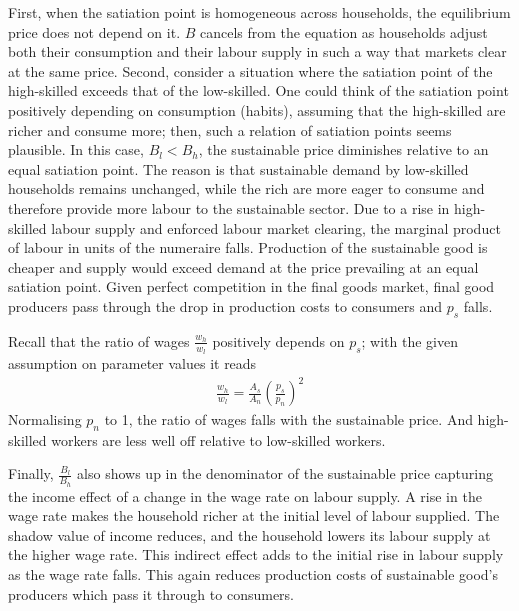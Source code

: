 First, when the satiation point is homogeneous across households, the equilibrium price does not depend on it. $B$ cancels from the equation as households adjust both their consumption and their labour supply in such a way that markets clear at the same price. Second, consider a situation where the satiation point of the high-skilled  exceeds that of the low-skilled. One could think of the satiation point positively depending on consumption (habits), assuming that the high-skilled are richer and consume more; then, such a relation of satiation points seems plausible. In this case, $B_l<B_h$, the sustainable price diminishes relative to an equal satiation point. The reason is that sustainable demand by low-skilled households remains unchanged, while the rich are more eager to consume and therefore provide more labour to the sustainable sector. 
Due to a rise in high-skilled labour supply and enforced labour market clearing, the marginal product of labour in units of the numeraire falls.
Production of the sustainable good is cheaper and supply would exceed demand at the price prevailing at an equal satiation point. Given perfect competition in the final goods market, final good producers pass through the drop in production costs to consumers and $p_s$ falls.


Recall that the ratio of wages $\frac{w_h}{w_l}$ positively depends on $p_s$; with the given assumption on parameter values it reads
\begin{align}
\frac{w_h}{w_l}= \frac{A_s}{A_n}\left(\frac{p_s}{p_n}\right)^2
\end{align} 
Normalising $p_n$ to 1, the ratio of wages falls with the sustainable price. And high-skilled workers are less well off relative to low-skilled workers. 

Finally, $\frac{B_l}{B_h}$ also shows up in the denominator of the sustainable price capturing the income effect of a change in the wage rate on labour supply. A rise in the wage rate makes the household richer at the initial level of labour supplied. The shadow value of income reduces, and the household lowers its labour supply at the higher wage rate. 
This indirect effect adds to the initial rise in labour supply as the wage rate falls. This again reduces production costs of sustainable good's producers which pass it through to consumers.  

